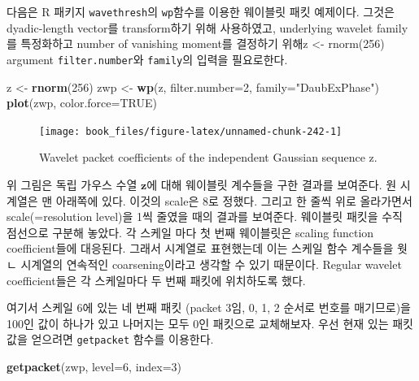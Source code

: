\documentclass[b5paper,]{scrbook}
\makeatletter
\newenvironment{Shaded}{\begin{snugshade}}{\end{snugshade}}
\newcommand{\KeywordTok}[1]{\textcolor[rgb]{0.13,0.29,0.53}{\textbf{#1}}}
\newcommand{\DataTypeTok}[1]{\textcolor[rgb]{0.13,0.29,0.53}{#1}}
\newcommand{\DecValTok}[1]{\textcolor[rgb]{0.00,0.00,0.81}{#1}}
\newcommand{\StringTok}[1]{\textcolor[rgb]{0.31,0.60,0.02}{#1}}
\newcommand{\OtherTok}[1]{\textcolor[rgb]{0.56,0.35,0.01}{#1}}
\newcommand{\NormalTok}[1]{#1}
\theoremstyle{plain}
\theoremstyle{definition}
\numberwithin{equation}{section}
\newenvironment{kframe}{%
\medskip{}
\setlength{\fboxsep}{.8em}
 \def\at@end@of@kframe{}%
 \ifinner\ifhmode%
  \def\at@end@of@kframe{\end{minipage}}%
  \begin{minipage}{\columnwidth}%
 \fi\fi%
 \def\FrameCommand##1{\hskip\@totalleftmargin \hskip-\fboxsep
 \colorbox{shadecolor}{##1}\hskip-\fboxsep
     \hskip-\linewidth \hskip-\@totalleftmargin \hskip\columnwidth}%
 \MakeFramed {\advance\hsize-\width
   \@totalleftmargin\z@ \linewidth\hsize
   \@setminipage}}%
 {\par\unskip\endMakeFramed%
 \at@end@of@kframe}
\renewenvironment{Shaded}{\begin{kframe}}{\end{kframe}}
\makeatother
\begin{document}
다음은 R 패키지 \texttt{wavethresh}의 \texttt{wp}함수를 이용한 웨이블릿
패킷 예제이다. 그것은 dyadic-length vector를 transform하기 위해
사용하였고, underlying wavelet family를 특정화하고 number of vanishing
moment를 결정하기 위해z \textless{}- rnorm(256) argument
\texttt{filter.number}와 \texttt{family}의 입력을 필요로한다.

\begin{Shaded}
\begin{Highlighting}[]
\NormalTok{z <-}\StringTok{ }\KeywordTok{rnorm}\NormalTok{(}\DecValTok{256}\NormalTok{)}
\NormalTok{zwp <-}\StringTok{ }\KeywordTok{wp}\NormalTok{(z, }\DataTypeTok{filter.number=}\DecValTok{2}\NormalTok{, }\DataTypeTok{family=}\StringTok{"DaubExPhase"}\NormalTok{)}
\KeywordTok{plot}\NormalTok{(zwp, }\DataTypeTok{color.force=}\OtherTok{TRUE}\NormalTok{)}
\end{Highlighting}
\end{Shaded}

\begin{figure}

{\centering \texttt{[image: book\_files/figure-latex/unnamed-chunk-242-1]} 

}

\caption{Wavelet packet coefficients of the independent Gaussian sequence z.}\label{fig:unnamed-chunk-242}
\end{figure}

위 그림은 독립 가우스 수열 \(\mathbf{z}\)에 대해 웨이블릿 계수들을 구한
결과를 보여준다. 원 시계열은 맨 아래쪽에 있다. 이것의 scale은 8로
정했다. 그리고 한 줄씩 위로 올라가면서 scale(=resolution level)을 1씩
줄였을 때의 결과를 보여준다. 웨이블릿 패킷을 수직 점선으로 구분해
놓았다. 각 스케일 마다 첫 번째 웨이블릿은 scaling function
coefficient들에 대응된다. 그래서 시계열로 표현했는데 이는 스케일 함수
계수들을 웟ㄴ 시계열의 연속적인 coarsening이라고 생각할 수 있기
때문이다. Regular wavelet coefficient들은 각 스케일마다 두 번째 패킷에
위치하도록 했다.

여기서 스케일 6에 있는 네 번째 패킷 (packet 3임, 0, 1, 2 순서로 번호를
매기므로)을 100인 값이 하나가 있고 나머지는 모두 0인 패킷으로
교체해보자. 우선 현재 있는 패킷 값을 얻으려면 \texttt{getpacket} 함수를
이용한다.

\begin{Shaded}
\begin{Highlighting}[]
\KeywordTok{getpacket}\NormalTok{(zwp, }\DataTypeTok{level=}\DecValTok{6}\NormalTok{, }\DataTypeTok{index=}\DecValTok{3}\NormalTok{)}
\end{Highlighting}
\end{Shaded}
\end{document}
